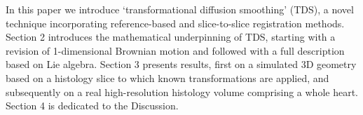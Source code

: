   In this paper we introduce `transformational diffusion smoothing' (TDS), a novel technique incorporating reference-based and slice-to-slice registration methods. Section 2 introduces the mathematical underpinning of TDS, starting with a revision of 1-dimensional Brownian motion and followed with a full description based on Lie algebra. Section 3 presents results, first on a simulated 3D geometry based on a histology slice to which known transformations are applied, and subsequently on a real high-resolution histology volume comprising a whole heart. Section 4 is dedicated to the Discussion.
  
  

